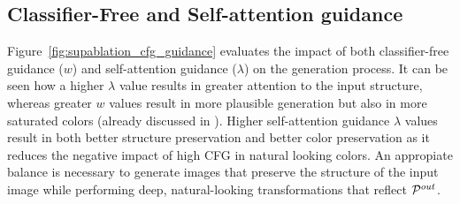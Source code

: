 

\subsection{Classifier-Free and Self-attention guidance} 

\label{sub:sup_results_ablation}

Figure~\ref{fig:supablation_cfg_guidance} evaluates the impact of both classifier-free guidance ($w$) and self-attention guidance ($\lambda$) on the generation process. It can be seen how a higher $\lambda$ value results in greater attention to the input structure, whereas greater $w$ values result in more plausible generation but also in more saturated colors (already discussed in \cite{ho2021classifier}). Higher self-attention guidance $\lambda$ values result in both better structure preservation and better color preservation as it reduces the negative impact of high CFG in natural looking colors. An appropiate balance is necessary to generate images that preserve the structure of the input image while performing deep, natural-looking transformations that reflect ${{\mathcal{P}}^{out}}$.






